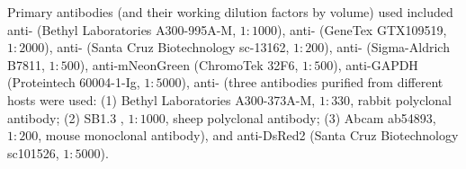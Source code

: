 Primary antibodies (and their working dilution factors by volume) used included anti- (Bethyl Laboratories A300-995A-M, $1 : 1000$), anti- (GeneTex GTX109519, $1 : 2000$), anti- (Santa Cruz Biotechnology sc-13162, $1 : 200$), anti- (Sigma-Aldrich B7811, $1 : 500$), anti-mNeonGreen (ChromoTek 32F6, $1 : 500$), anti-GAPDH (Proteintech 60004-1-Ig, $1 : 5000$), anti- (three antibodies purified from different hosts were used: (1) Bethyl Laboratories A300-373A-M, $1 : 330$, rabbit polyclonal antibody; (2) SB1.3 \cite{SheepAntiBUB1}, $1 : 1000$, sheep polyclonal antibody; (3) Abcam ab54893, $1 : 200$, mouse monoclonal antibody), and anti-DsRed2 (Santa Cruz Biotechnology sc101526, $1 : 5000$).